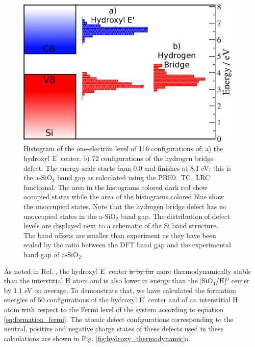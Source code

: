 \documentclass[aps,prb,reprint,superscriptaddress,showpacs]{revtex4-1}
\providecommand{\DIFadd}[1]{{\protect\color{blue}\uwave{#1}}} %
\providecommand{\DIFdel}[1]{{\protect\color{red}\sout{#1}}}                      %
\providecommand{\DIFaddbegin}{} %
\providecommand{\DIFaddend}{} %
\providecommand{\DIFdelbegin}{} %
\providecommand{\DIFdelend}{} %
\begin{document}
\begin{figure}[h!]
\includegraphics{hdefects_sisio2.png}
\caption{Histogram of the one-electron level of 116 configurations of; a) the hydroxyl E$^\prime$ center, b) 72 configurations of the hydrogen bridge defect. The energy scale starts from 0.0 and finishes at 8.1 eV; this is the a-SiO$_2$ band gap as calculated using the PBE0\_TC\_LRC functional. The area in the histograms colored dark red show occupied states while the area of the histograms colored blue show the unoccupied states. Note that the hydrogen bridge defect has no unoccupied states in the a-SiO$_2$ band gap. The distribution of defect levels are displayed next to a schematic of the Si band structure. The band offsets are smaller than experiment as they have been scaled by the ratio between the DFT band gap and the experimental band gap of a-SiO$_2$.} 
\label{fig:sio2_h_dos}
\end{figure}

As noted in Ref. \cite{aelsayed_prl}, the hydroxyl E$^\prime$ center \DIFdelbegin \DIFdel{is by far }\DIFdelend \DIFaddbegin \DIFadd{can be }\DIFaddend more thermodynamically stable than the interstitial H atom and is also lower in energy than the [SiO$_4$/H]$^0$ center by 1.1 eV on average. To demonstrate that, we have calculated the formation energies of 50 configurations of the hydroxyl E$^\prime$ center and of an interstitial H atom with respect to the Fermi level of the system according to equation \ref{eq:formation_fermi}. The atomic defect configurations corresponding to the neutral, positive and negative charge states of these defects used in these calculations are shown in Fig. \ref{fig:hydroxy_thermodynamic}a. 
\end{document}
